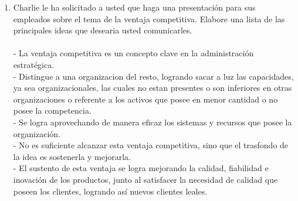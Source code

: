 \begin{itemize}
\begin{enumerate}
		\item Charlie le ha solicitado a usted que haga una presentaci\'on para sus empleados sobre el tema de la ventaja competitiva. Elabore una lista de las principales ideas que desearia usted comunicarles.\\\\

		- La ventaja competitiva es un concepto clave en la administraci\'on estrat\'egica.\\
		- Distingue a una organizacion del resto, logrando sacar a luz las capacidades, ya sea organizacionales, las cuales no estan presentes o son inferiores en otras organizaciones o referente a los activos que posee en menor cantidad o no posee la competencia.\\
		- Se logra aprovechando de manera eficaz los sistemas y recursos que posee la organizaci\'on.\\
		- No es suficiente alcanzar esta ventaja competitiva, sino que el trasfondo de la idea es sostenerla y mejorarla.\\
		- El sustento de esta ventaja se logra mejorando la calidad, fiabilidad e inovaci\'on de los productos, junto al satisfacer la necesidad de calidad que poseen los clientes, logrando as\'i nuevos clientes leales.\\

	\end{enumerate}
\end{itemize}
